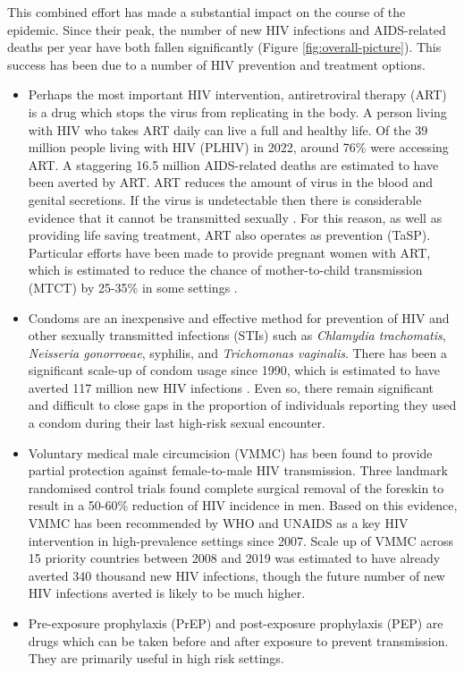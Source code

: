 \documentclass[a4paper, nobind]{templates/ociamthesis}
\providecommand{\tightlist}{%
  \setlength{\itemsep}{0pt}\setlength{\parskip}{0pt}}
\begin{document}
This combined effort has made a substantial impact on the course of the epidemic.
Since their peak, the number of new HIV infections and AIDS-related deaths per year have both fallen significantly (Figure \ref{fig:overall-picture}).
This success has been due to a number of HIV prevention and treatment options.

\begin{itemize}
\tightlist
\item
  Perhaps the most important HIV intervention, antiretroviral therapy (ART) is a drug which stops the virus from replicating in the body.
  A person living with HIV who takes ART daily can live a full and healthy life.
  Of the 39 million people living with HIV (PLHIV) in 2022, around 76\% were accessing ART.
  A staggering 16.5 million AIDS-related deaths are estimated to have been averted by ART.
  ART reduces the amount of virus in the blood and genital secretions.
  If the virus is undetectable then there is considerable evidence that it cannot be transmitted sexually \autocite{cohen2011prevention}.
  For this reason, as well as providing life saving treatment, ART also operates as prevention (TaSP).
  Particular efforts have been made to provide pregnant women with ART, which is estimated to reduce the chance of mother-to-child transmission (MTCT) by 25-35\% in some settings \autocite{siegfried2011antiretrovirals}.
\item
  Condoms are an inexpensive and effective method for prevention of HIV and other sexually transmitted infections (STIs) such as \emph{Chlamydia trachomatis}, \emph{Neisseria gonorroeae}, syphilis, and \emph{Trichomonas vaginalis}.
  There has been a significant scale-up of condom usage since 1990, which is estimated to have averted 117 million new HIV infections \autocite{stover2021impact}.
  Even so, there remain significant and difficult to close gaps in the proportion of individuals reporting they used a condom during their last high-risk sexual encounter.
\item
  Voluntary medical male circumcision (VMMC) has been found to provide partial protection against female-to-male HIV transmission.
  Three landmark randomised control trials \autocite{auvert2005randomized,gray2007male,bailey2007male} found complete surgical removal of the foreskin to result in a 50-60\% reduction of HIV incidence in men.
  Based on this evidence, VMMC has been recommended by WHO and UNAIDS as a key HIV intervention in high-prevalence settings since 2007.
  Scale up of VMMC across 15 priority countries between 2008 and 2019 was estimated to have already averted 340 thousand new HIV infections, though the future number of new HIV infections averted is likely to be much higher.
\item
  Pre-exposure prophylaxis (PrEP) and post-exposure prophylaxis (PEP) are drugs which can be taken before and after exposure to prevent transmission.
  They are primarily useful in high risk settings.
\end{itemize}
\end{document}
